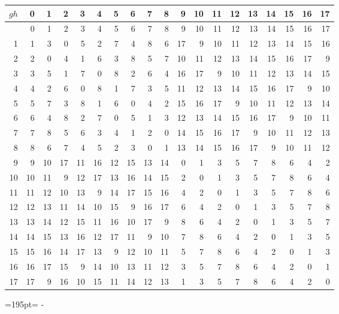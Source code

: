 \documentclass[10pt,a4paper]{article}
\newcommand{\needspace}[1]{\par\penalty-100\begingroup\dimen0=#1\relax\dimen2=\pagegoal
  \advance\dimen2-\pagetotal\ifdim\dimen0>\dimen2\relax\ifdim\dimen2>0pt\vfil\break\fi\fi
  \endgroup}
\numberwithin{equation}{section}
\begin{document}
{\normalsize\setlength{\tabcolsep}{0.1em}\setlength{\LTleft}{-8pt plus 1fill}\setlength{\LTright}{-8pt plus 1fill}\begin{longtable}{@{}r|rrrrrrrrrrrrrrrrrr@{}}\toprule
$gh$ & 0 & 1 & 2 & 3 & 4 & 5 & 6 & 7 & 8 & 9 & 10 & 11 & 12 & 13 & 14 & 15 & 16 & 17\\\midrule\endhead
\bottomrule\endfoot\endlastfoot
0 & 0 & 1 & 2 & 3 & 4 & 5 & 6 & 7 & 8 & 9 & 10 & 11 & 12 & 13 & 14 & 15 & 16 & 17\\*
1 & 1 & 3 & 0 & 5 & 2 & 7 & 4 & 8 & 6 & 17 & 9 & 10 & 11 & 12 & 13 & 14 & 15 & 16\\
2 & 2 & 0 & 4 & 1 & 6 & 3 & 8 & 5 & 7 & 10 & 11 & 12 & 13 & 14 & 15 & 16 & 17 & 9\\
3 & 3 & 5 & 1 & 7 & 0 & 8 & 2 & 6 & 4 & 16 & 17 & 9 & 10 & 11 & 12 & 13 & 14 & 15\\
4 & 4 & 2 & 6 & 0 & 8 & 1 & 7 & 3 & 5 & 11 & 12 & 13 & 14 & 15 & 16 & 17 & 9 & 10\\
5 & 5 & 7 & 3 & 8 & 1 & 6 & 0 & 4 & 2 & 15 & 16 & 17 & 9 & 10 & 11 & 12 & 13 & 14\\
6 & 6 & 4 & 8 & 2 & 7 & 0 & 5 & 1 & 3 & 12 & 13 & 14 & 15 & 16 & 17 & 9 & 10 & 11\\
7 & 7 & 8 & 5 & 6 & 3 & 4 & 1 & 2 & 0 & 14 & 15 & 16 & 17 & 9 & 10 & 11 & 12 & 13\\
8 & 8 & 6 & 7 & 4 & 5 & 2 & 3 & 0 & 1 & 13 & 14 & 15 & 16 & 17 & 9 & 10 & 11 & 12\\
9 & 9 & 10 & 17 & 11 & 16 & 12 & 15 & 13 & 14 & 0 & 1 & 3 & 5 & 7 & 8 & 6 & 4 & 2\\
10 & 10 & 11 & 9 & 12 & 17 & 13 & 16 & 14 & 15 & 2 & 0 & 1 & 3 & 5 & 7 & 8 & 6 & 4\\
11 & 11 & 12 & 10 & 13 & 9 & 14 & 17 & 15 & 16 & 4 & 2 & 0 & 1 & 3 & 5 & 7 & 8 & 6\\
12 & 12 & 13 & 11 & 14 & 10 & 15 & 9 & 16 & 17 & 6 & 4 & 2 & 0 & 1 & 3 & 5 & 7 & 8\\
13 & 13 & 14 & 12 & 15 & 11 & 16 & 10 & 17 & 9 & 8 & 6 & 4 & 2 & 0 & 1 & 3 & 5 & 7\\
14 & 14 & 15 & 13 & 16 & 12 & 17 & 11 & 9 & 10 & 7 & 8 & 6 & 4 & 2 & 0 & 1 & 3 & 5\\
15 & 15 & 16 & 14 & 17 & 13 & 9 & 12 & 10 & 11 & 5 & 7 & 8 & 6 & 4 & 2 & 0 & 1 & 3\\
16 & 16 & 17 & 15 & 9 & 14 & 10 & 13 & 11 & 12 & 3 & 5 & 7 & 8 & 6 & 4 & 2 & 0 & 1\\*
17 & 17 & 9 & 16 & 10 & 15 & 11 & 14 & 12 & 13 & 1 & 3 & 5 & 7 & 8 & 6 & 4 & 2 & 0\\
\bottomrule\end{longtable}}
\needspace{195pt}
\end{document}
